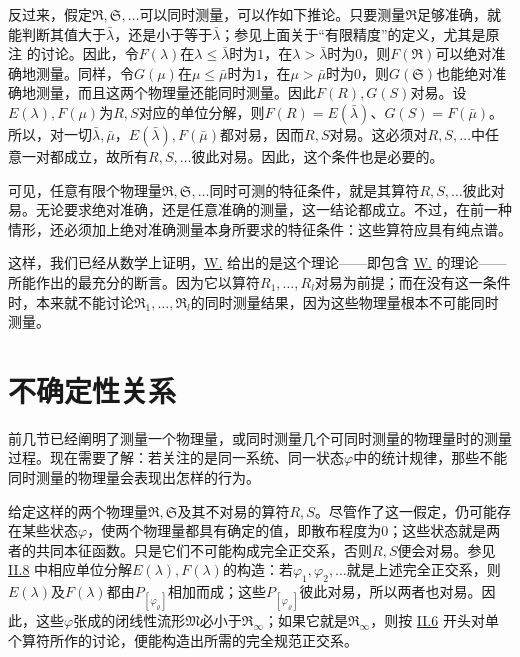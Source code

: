 \documentclass[fontsize=13pt,twoside,openany,headings=normal,parskip=false,bookmarkpackage=false,DIV=calc]{scrbook}
\begin{document}
反过来，假定$\mathfrak R,\allowbreak \mathfrak S,\allowbreak \ldots$可以同时测量，可以作如下推论。只要测量$\mathfrak R$足够准确，就能判断其值大于$\bar\lambda$，还是小于等于$\bar\lambda$；参见上面关于“有限精度”的定义，尤其是原注 \hyperlink{note-126}{} 的讨论。因此，令$F(\lambda)$在$\lambda\le\bar\lambda$时为$1$，在$\lambda>\bar\lambda$时为$0$，则$F(\mathfrak R)$可以绝对准确地测量。同样，令$G(\mu)$在$\mu\le\bar\mu$时为$1$，在$\mu>\bar\mu$时为$0$，则$G(\mathfrak S)$也能绝对准确地测量，而且这两个物理量还能同时测量。因此$F(R),\allowbreak G(S)$对易。\hypertarget{origpage-121}{}\label{origpage-121}设$E(\lambda),\allowbreak F(\mu)$为$R,\allowbreak S$对应的单位分解，则$F(R)=E(\bar\lambda)$、$G(S)=F(\bar\mu)$。所以，对一切$\bar\lambda,\allowbreak \bar\mu$，$E(\bar\lambda),\allowbreak F(\bar\mu)$都对易，因而$R,\allowbreak S$对易。这必须对$R,\allowbreak S,\allowbreak \ldots$中任意一对都成立，故所有$R,\allowbreak S,\allowbreak \ldots$彼此对易。因此，这个条件也是必要的。

可见，任意有限个物理量$\mathfrak R,\allowbreak \mathfrak S,\allowbreak \ldots$同时可测的特征条件，就是其算符$R,\allowbreak S,\allowbreak \ldots$彼此对易。无论要求绝对准确，还是任意准确的测量，这一结论都成立。不过，在前一种情形，还必须加上绝对准确测量本身所要求的特征条件：这些算符应具有纯点谱。

这样，我们已经从数学上证明，\hyperref[post:III.1.W]{W.} 给出的是这个理论——即包含 \hyperref[post:III.1.W]{W.} 的理论——所能作出的最充分的断言。因为它以算符$R_1,\allowbreak \ldots,\allowbreak R_l$对易为前提；而在没有这一条件时，本来就不能讨论$\mathfrak R_1,\allowbreak \ldots,\allowbreak \mathfrak R_l$的同时测量结果，因为这些物理量根本不可能同时测量。

\section{不确定性关系}\label{sec:III.4}
前几节已经阐明了测量一个物理量，或同时测量几个可同时测量的物理量时的测量过程。现在需要了解：若关注的是同一系统、同一状态$\varphi$中的统计规律，那些不能同时测量的物理量会表现出怎样的行为。

给定这样的两个物理量$\mathfrak R,\allowbreak \mathfrak S$及其不对易的算符$R,\allowbreak S$。尽管作了这一假定，仍可能存在某些状态$\varphi$，使两个物理量都具有确定的值，即散布程度为$0$；这些状态就是两者的共同本征函数。只是它们不可能构成完全正交系，否则$R,\allowbreak S$便会对易。参见 \hyperref[sec:II.8]{II.8} 中相应单位分解$E(\lambda),\allowbreak F(\lambda)$的构造：若$\varphi_1,\allowbreak \varphi_2,\allowbreak \ldots$就是上述完全正交系，则$E(\lambda)$及$F(\lambda)$都由$P_{[\varphi_\varrho]}$相加而成；这些$P_{[\varphi_\varrho]}$彼此对易，所以两者也对易。因此，这些$\varphi$张成的闭线性流形$\mathfrak M$必小于$\mathfrak R_\infty$；如果它就是$\mathfrak R_\infty$，则按 \hyperref[sec:II.6]{II.6} 开头对单个算符所作的讨论，便能构造出所需的完全规范正交系。
\end{document}
